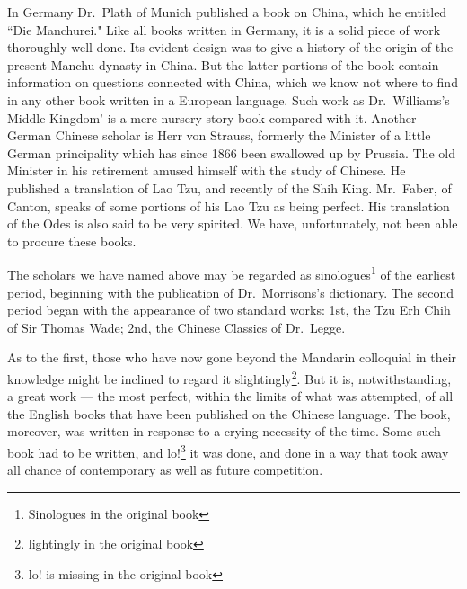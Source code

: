 In Germany Dr.~Plath of Munich published a book on China, which he entitled ``Die Manchurei." 
Like all books written in Germany, it is a solid piece of work thoroughly well done.
Its evident design was to give a history of the origin of the present Manchu dynasty in China.
But the latter portions of the book contain information on questions connected with China, which we know not where to find in any other book written in a European language.
Such work as Dr.~Williams's  Middle Kingdom'  is a mere nursery story-book compared with it.
Another German Chinese scholar is Herr von Strauss,  formerly the Minister of a little German principality which has since 1866 been swallowed up by Prussia.
The old Minister in his retirement amused himself with the study of Chinese.
He published a translation of Lao Tzu,  and recently of the Shih King. 
Mr.~Faber,  of Canton,  speaks of some portions of his Lao Tzu as being perfect.
His translation of the Odes is also said to be very spirited.
We have, unfortunately, not been able to procure these books.

The scholars we have named above may be regarded as sinologues\footnote{Sinologues in the original book} of the earliest period, beginning with the publication of Dr.~Morrisons's dictionary.
The second period began with the appearance of two standard works: 1st, the Tzu Erh Chih  of Sir Thomas Wade;  2nd, the Chinese Classics of Dr.~Legge. 

As to the first, those who have now gone beyond the Mandarin colloquial in their knowledge might be inclined to regard it slightingly\footnote{lightingly in the original book}.
But it is, notwithstanding, a great work --- the most perfect, within the limits of what was attempted, of all the English books that have been published on the Chinese language.
The book, moreover, was written in response to a crying necessity of the time.
Some such book had to be written, and lo!\footnote{lo! is missing in the original book}  it was done, and done in a way that took away all chance of contemporary as well as future competition.

